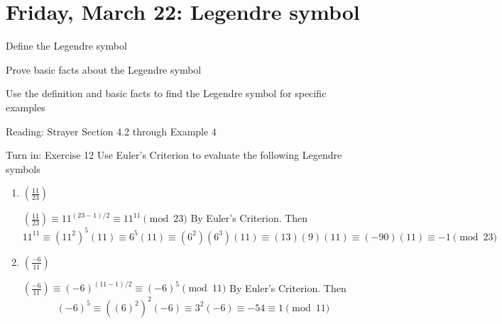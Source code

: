 \documentclass[letterpaper, 11 pt]{ximera}
\begin{document}
\section{Friday, March 22: Legendre symbol}

\begin{obj}
    \item Define the Legendre symbol
    \item Prove basic facts about the Legendre symbol
    \item Use the definition and basic facts to find the Legendre symbol for specific examples
\end{obj}


\begin{pre}
    \item[Reading:] Strayer Section 4.2 through Example 4
    \item[Turn in:] Exercise 12
     Use Euler's Criterion to evaluate the following Legendre symbols 
	\begin{enumerate}
 		\item $\left(\frac{11}{23}\right)$
		
		\begin{solution}
 			$\left(\frac{11}{23}\right)\equiv 11^{(23-1)/2}\equiv 11^{11}\pmod{23}$ By Euler's Criterion. Then
			\[11^{11}\equiv (11^{2})^{5}(11)\equiv 6^5(11)\equiv (6^2)(6^3)(11)\equiv (13)(9)(11)\equiv(-90)(11)\equiv -1\pmod{23}\]
		\end{solution}
		
		\item $\left(\frac{-6}{11}\right)$
		
		\begin{solution}
 			$\left(\frac{-6}{11}\right)\equiv (-6)^{(11-1)/2}\equiv (-6)^{5}\pmod{11}$ By Euler's Criterion. Then
			\[(-6)^{5}\equiv ((6)^{2})^{2}(-6)\equiv 3^2(-6)\equiv -54 \equiv 1\pmod{11}\]
		\end{solution}
	\end{enumerate}
 

    \end{pre}
\end{document}
